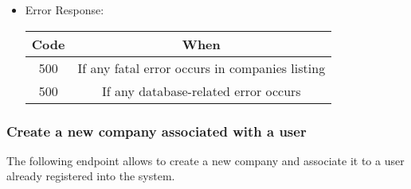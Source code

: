 \begin{itemize}
    \item Error Response:
    \begin{table}[!h]
    \centering 
    \begin{tabular}{|c|c|}
    \hline
    \multicolumn{1}{|c|}{\textbf{Code}} & \multicolumn{1}{c|}{\textbf{When}} \\ \hline
    500 & If any fatal error occurs in companies listing \\\hline
    500 & If any database-related error occurs \\\hline
    \end{tabular} 
    \end{table} 
    
\end{itemize}


\newpage
\subsubsection*{Create a new company associated with a user}

The following endpoint allows to create a new company and associate it to a user already registered into the system.

